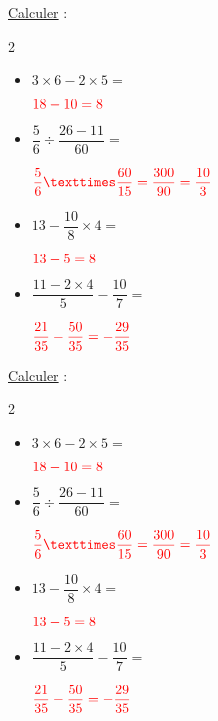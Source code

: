 \documentclass{automatisme}
\begin{document}
\newcommand{\Calculs}{
	\begin{frame}
		\uline{Calculer} :

		\begin{multicols}{2}
			\begin{itemize}
				\item $3 × 6 - 2 × 5 = $\vspace{0.5em}

				      $\correction{18 - 10 = 8}$\vspace{2em}
				\item $\dfrac{5}{6} ÷ \dfrac{26 - 11}{60} =$\vspace{0.5em}

				      $\correction{\dfrac{5}{6} × \dfrac{60}{15} = \dfrac{300}{90} = \dfrac{10}{3}}$
				\item $13 - \dfrac{10}{8} × 4 =$\vspace{0.5em}

				      $\correction{13 - 5 = 8}$\vspace{1em}
				\item $\dfrac{11 - 2 × 4}{5} - \dfrac{10}{7} =$\vspace{0.5em}

				      $\correction{\dfrac{21}{35} - \dfrac{50}{35} = -\dfrac{29}{35}}$
			\end{itemize}
		\end{multicols}
	\end{frame}
}

\Calculs

\newcommand{\makeCorrection}{}
\Calculs
\end{document}
